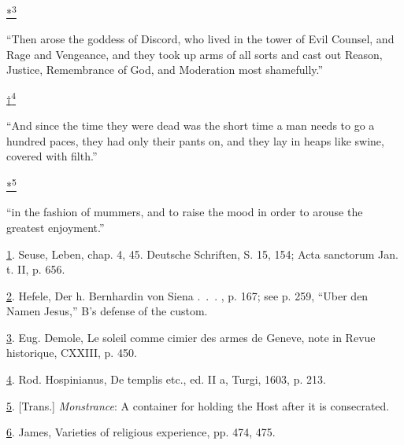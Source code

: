 \protect\hypertarget{23_NOTES.xhtmlux5cux23id_2578}{\protect\hyperlink{16_Chapter_Nine__THE_DECLINE_OF_SYM.xhtmlux5cux23id_2577}{*\textsuperscript{3}}}
``Then arose the goddess of Discord, who lived in the tower of Evil
Counsel, and Rage and Vengeance, and they took up arms of all sorts and
cast out Reason, Justice, Remembrance of God, and Moderation most
shamefully.''

\protect\hypertarget{23_NOTES.xhtmlux5cux23id_2580}{\protect\hyperlink{16_Chapter_Nine__THE_DECLINE_OF_SYM.xhtmlux5cux23id_2579}{†\textsuperscript{4}}}
``And since the time they were dead was the short time a man needs to go
a hundred paces, they had only their pants on, and they lay in heaps
like swine, covered with filth.''

\protect\hypertarget{23_NOTES.xhtmlux5cux23id_2582}{\protect\hyperlink{16_Chapter_Nine__THE_DECLINE_OF_SYM.xhtmlux5cux23id_2581}{*\textsuperscript{5}}}
``in the fashion of mummers, and to raise the mood in order to arouse
the greatest enjoyment.''

\protect\hypertarget{23_NOTES.xhtmlux5cux23id_791}{\protect\hyperlink{16_Chapter_Nine__THE_DECLINE_OF_SYM.xhtmlux5cux23id_790}{1}}.
Seuse, Leben, chap. 4, 45. Deutsche Schriften, S. 15, 154; Acta
sanctorum Jan. t. II, p. 656.

\protect\hypertarget{23_NOTES.xhtmlux5cux23id_789}{\protect\hyperlink{16_Chapter_Nine__THE_DECLINE_OF_SYM.xhtmlux5cux23id_788}{2}}.
Hefele, Der h. Bernhardin von Siena .~.~. , p. 167; see p. 259, ``Uber
den Namen Jesus,'' B's defense of the custom.

\protect\hypertarget{23_NOTES.xhtmlux5cux23id_787}{\protect\hyperlink{16_Chapter_Nine__THE_DECLINE_OF_SYM.xhtmlux5cux23id_786}{3}}.
Eug. Demole, Le soleil comme cimier des armes de Geneve, note in Revue
historique, CXXIII, p. 450.

\protect\hypertarget{23_NOTES.xhtmlux5cux23page_425}{\protect\hyperlink{16_Chapter_Nine__THE_DECLINE_OF_SYM.xhtmlux5cux23id_785}{4}}.
Rod. Hospinianus, De templis etc., ed. II a, Turgi, 1603, p. 213.

\protect\hypertarget{23_NOTES.xhtmlux5cux23id_784}{\protect\hyperlink{16_Chapter_Nine__THE_DECLINE_OF_SYM.xhtmlux5cux23id_783}{5}}.
{[}Trans.{]} \emph{Monstrance}: A container for holding the Host after
it is consecrated.

\protect\hypertarget{23_NOTES.xhtmlux5cux23id_782}{\protect\hyperlink{16_Chapter_Nine__THE_DECLINE_OF_SYM.xhtmlux5cux23id_781}{6}}.
James, Varieties of religious experience, pp. 474, 475.

